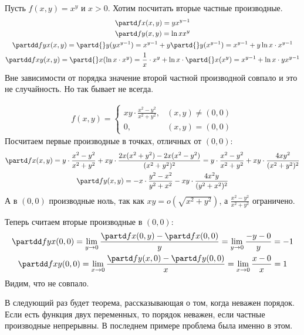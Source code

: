 \begin{exmp}
  Пусть $f(x, y) = x^y$ и $x>0$.
  Хотим посчитать вторые частные производные.
	\begin{gather*}
	\partd f x (x, y) = yx^{y-1} \\
	\partd f y (x, y) = \ln x x^y \\
	\partdd f y x (x, y) = \partd{}y(yx^{y-1}) = x^{y-1}+y\partd{}y(x^{y-1}) = x^{y-1}+y\ln x \cdot x^{y-1} \\
	\partdd f x y (x, y) = \partd{}x(\ln x \cdot x^y) = \frac 1 x \cdot x^y + \ln x \cdot \partd{}x(x^y) = x^{y-1}+\ln x \cdot yx^{y-1}
	\end{gather*}
	Вне зависимости от порядка значение второй частной производной совпало и это не случайность.
	Но так бывает не всегда.
\end{exmp}
\begin{exmp}
	\begin{gather*}
	f(x, y) =
		\begin{cases}
			xy \cdot \frac{x^2-y^2}{x^2+y^2}, & (x, y) \ne (0, 0) \\
			0, & (x, y) = (0, 0)
		\end{cases}
	\end{gather*}
	Посчитаем первые производные в точках, отличных от $(0, 0)$:
	\begin{gather*}
	\partd f x (x, y) = y \cdot \frac{x^2-y^2}{x^2+y^2} + xy \cdot \frac{2x(x^2+y^2)-2x(x^2-y^2)}{(x^2+y^2)^2}
	                  = y \cdot \frac{x^2-y^2}{x^2+y^2} + xy \cdot \frac{4xy^2}{(x^2+y^2)^2} \\
	\partd f y (x, y) = -x \cdot \frac{y^2-x^2}{y^2+x^2} - xy \cdot \frac{4x^2y}{(y^2+x^2)^2}
	\end{gather*}
	А в $(0, 0)$ производные ноль, так как $xy=o(\sqrt{x^2+y^2})$, а $\frac{x^2-y^2}{x^2+y^2}$ ограничено.

	Теперь считаем вторые производные в $(0, 0)$:
	\begin{gather*}
	\partdd f y x (0, 0) = \lim_{y\to 0} \frac{\partd f x (0, y) - \partd f x (0, 0)}{y}
	                     = \lim_{y\to 0} \frac{-y - 0}{y} = -1 \\
	\partdd f x y (0, 0) = \lim_{x\to 0} \frac{\partd f y (x, 0) - \partd f y (0, 0)}{x}
	                     = \lim_{x\to 0} \frac{x - 0}{x} = 1 \\
	\end{gather*}
	Видим, что не совпало.
\end{exmp}
\begin{Rem}
	В следующий раз будет теорема, рассказывающая о том, когда неважен порядок.
	Если есть функция двух переменных, то порядок неважен, если частные производные непрерывны.
	В последнем примере проблема была именно в этом.
\end{Rem}
